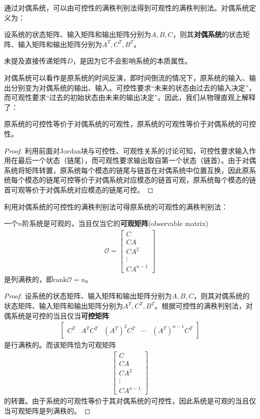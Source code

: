 通过对偶系统，可以由可控性的满秩判别法得到可观性的满秩判别法。对偶系统定义为：
\begin{definition}[对偶系统]
    设系统的状态矩阵、输入矩阵和输出矩阵分别为$A,B,C$，则其\textbf{对偶系统}的状态矩阵、输入矩阵和输出矩阵分别为$A^T,C^T,B^T$。
\end{definition}

未提及直接传递矩阵$D$，是因为它不会影响系统的本质属性。

对偶系统可以看作是原系统的时间反演，即时间倒流的情况下，原系统的输入、输出分别变为对偶系统的输出、输入。可控性要求“未来的状态由过去的输入决定”，而可观性要求“过去的初始状态由未来的输出决定”。因此，我们从物理直观上解释了：

\begin{theorem}
    原系统的可控性等价于对偶系统的可观性，原系统的可观性等价于对偶系统的可控性。
\end{theorem}
\begin{proof}
    利用前面对Jordan块与可控性、可观性关系的讨论可知，可控性要求输入作用在最后一个状态（链尾），而可观性要求输出取自第一个状态（链首）。由于对偶系统将矩阵转置，原系统每个模态的链尾与链首在对偶系统中位置互换，因此原系统每个模态的链尾可控等价于对偶系统对应模态的链首可观，原系统每个模态的链首可观等价于对偶系统对应模态的链尾可控。
\end{proof}

利用对偶系统的可控性的满秩判别法可得原系统的可观性的满秩判别法：

\begin{theorem}[可观性的满秩判别法]
    一个$n$阶系统是可观的，当且仅当它的\textbf{可观矩阵}(observable matrix)
    \begin{align*}
    \mathcal{O} =\begin{bmatrix}
    C\\
    CA\\
    CA^2\\
    \vdots\\
    CA^{n-1}
    \end{bmatrix}
    \end{align*}
    是列满秩的，即$\mathrm{rank}\mathcal{O}=n$。
\end{theorem}
\begin{proof}
    设系统的状态矩阵、输入矩阵和输出矩阵分别为$A,B,C$，则其对偶系统的状态矩阵、输入矩阵和输出矩阵分别为$A^T,C^T,B^T$。根据可控性的满秩判别法，对偶系统是可控的当且仅当\textbf{可控矩阵}
    \begin{align*}
    \begin{bmatrix}
    C^T & A^TC^T & (A^T)^2C^T & \cdots & (A^T)^{n-1}C^T
    \end{bmatrix}
    \end{align*}
    是行满秩的。而该矩阵恰为可观矩阵\begin{align*}
    \begin{bmatrix}
    C\\
    CA\\
    CA^2\\
    \vdots\\
    CA^{n-1}
    \end{bmatrix}
    \end{align*}
    的转置。由于系统的可观性等价于其对偶系统的可控性，因此系统是可观的当且仅当可观矩阵是列满秩的。
\end{proof}
